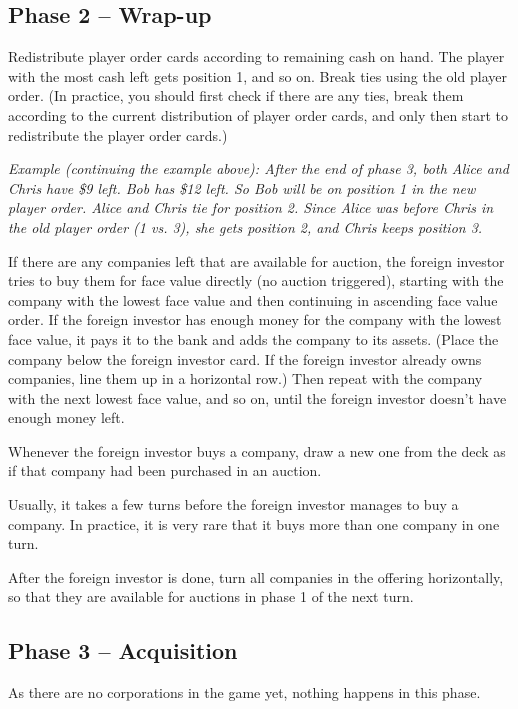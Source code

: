 \documentclass[10pt,final]{report}
\begin{document}
\begin{multicols}{2}
\subsection{Phase 2 -- Wrap-up}

Redistribute player order cards according to remaining cash on
hand. The player with the most cash left gets position 1, and so
on. Break ties using the old player order. (In practice, you should
first check if there are any ties, break them according to the current
distribution of player order cards, and only then start to
redistribute the player order cards.)

\emph{Example (continuing the example above): After
  the end of phase 3, both Alice and Chris have \$9 left. Bob has \$12
  left. So Bob will be on position 1 in the new player order. Alice
  and Chris tie for position 2. Since Alice was before Chris in the
  old player order (1 vs. 3), she gets position 2, and Chris keeps
  position 3.}

If there are any companies left that are available for auction, the
foreign investor tries to buy them for face value directly (no auction
triggered), starting with the company with the lowest face value and
then continuing in ascending face value order. If the foreign investor
has enough money for the company with the lowest face value, it pays
it to the bank and adds the company to its assets. (Place the company
below the foreign investor card. If the foreign investor already owns
companies, line them up in a horizontal row.) Then repeat with the
company with the next lowest face value, and so on, until the foreign
investor doesn't have enough money left.

Whenever the foreign investor buys a company, draw a new one from the
deck as if that company had been purchased in an auction.

Usually, it takes a few turns before the foreign investor manages to
buy a company. In practice, it is very rare that it buys more than one
company in one turn.

After the foreign investor is done, turn all companies in the offering
horizontally, so that they are available for auctions in phase 1 of the
next turn.

\subsection{Phase 3 -- Acquisition}

As there are no corporations in the game yet, nothing happens in this
phase.


\end{multicols}
\end{document}

